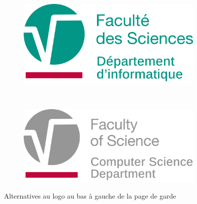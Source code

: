\documentclass{umonsreport}
\begin{document}
\begin{figure}[H]
\begin{subfigure}[t]{.4\textwidth}
    \end{subfigure}
    ~ 
    \begin{subfigure}[t]{.4\textwidth}
        \centering
        \includegraphics[width=\textwidth]{logos/FS-info.png}
    \end{subfigure}
    ~ 
    \begin{subfigure}[t]{.4\textwidth}
        \centering
        \includegraphics[width=\textwidth]{logos/FS-info-grey-EN.png}
    \end{subfigure}
    \caption{Alternatives au logo au bas à gauche de la page de garde}
    \label{fs-logos}
\end{figure}
\end{document}
